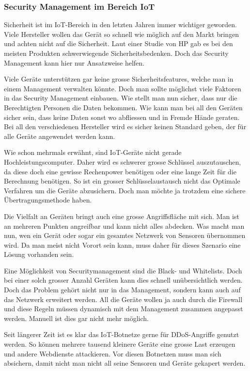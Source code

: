 \subsubsection{Security Management im Bereich IoT}
Sicherheit ist im IoT-Bereich in den letzten Jahren immer wichtiger geworden. Viele Hersteller wollen das Gerät so schnell wie möglich auf den Markt bringen und achten nicht auf die Sicherheit. Laut einer Studie von HP gab es bei den meisten Produkten schwerwiegende Sicherheitsbedenken.\cite{SecOverview} Doch das Security Management kann hier nur Ansatzweise helfen.

Viele Geräte unterstützen gar keine grosse Sicherheitsfeatures, welche man in einem Management verwalten könnte. Doch man sollte möglichst viele Faktoren in das Security Management einbauen. Wie stellt man nun sicher, dass nur die Berechtigten Personen die Daten bekommen. Wie kann man bei all den Geräten sicher sein, dass keine Daten sonst wo abfliessen und in Fremde Hände geraten. Bei all den verschiedenen Hersteller wird es sicher keinen Standard geben, der für alle Geräte angewendet werden kann.

Wie schon mehrmals erwähnt, sind IoT-Geräte nicht gerade Hochleistungscomputer. Daher wird es schwerer grosse Schlüssel auszutauschen, da diese doch eine gewisse Rechenpower benötigen oder eine lange Zeit für die Berechnung benötigen. So ist ein grosser Schlüsselaustausch nicht das Optimale Verfahren um die Geräte abzusichern. Doch man möchte ja trotzdem eine sichere Übertragungsmethode haben.

Die Vielfalt an Geräten bringt auch eine grosse Angriffsfläche mit sich. Man ist an mehreren Punkten angreifbar und kann nicht alles abdecken. Was macht man nun, wen ein Gerät oder sogar ein gesamtes Netzwerk von Sensoren übernommen wird. Da man meist nicht Vorort sein kann, muss daher für dieses Szenario eine Lösung vorhanden sein. 

Eine Möglichkeit von Securitymanagement sind die Black- und Whitelists. Doch bei einer solch grosser Anzahl Geräten kann dies schnell unübersichtlich werden. Doch das Problem gehört nicht nur in das Management, sondern kann auch auf das Netzwerk erweitert werden. All die Geräte wollen ja auch durch die Firewall und diese Regeln müssen dynamisch mit dem Management zusammen angepasst werden. Manuell ist dies gar nicht mehr möglich.

Seit längerer Zeit ist es klar das IoT-Botnetze gerne für DDoS-Angriffe genutzt werden. So können mehrere tausend kleinere Geräte eine grosse Last erzeugen und andere Webdienste attackieren. Vor diesen Botnetzen muss man sich absichern, damit nicht man nicht all seine Sensoren und Geräte gekapert werden. 




